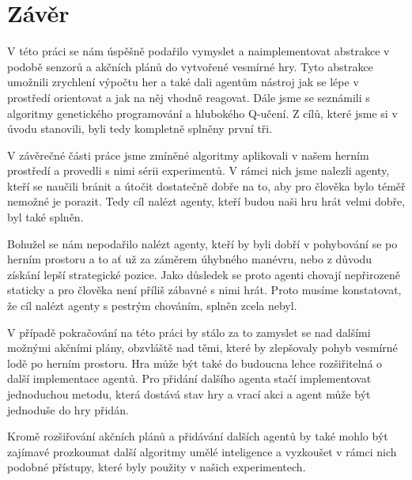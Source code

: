 \chapter*{Závěr}
V této práci se nám úspěšně podařilo vymyslet a naimplementovat abstrakce v podobě senzorů a akčních plánů do vytvořené vesmírné hry.
Tyto abstrakce umožnili zrychlení výpočtu her a také dali agentům nástroj jak se lépe v prostředí orientovat a jak na něj vhodně reagovat.
Dále jsme se seznámili s algoritmy genetického programování a hlubokého Q-učení.
Z cílů, které jsme si v úvodu stanovili, byli tedy kompletně splněny první tři.

V závěrečné části práce jsme zmíněné algoritmy aplikovali v našem herním prostředí a provedli s nimi sérii experimentů.
V rámci nich jsme nalezli agenty, kteří se naučili bránit a útočit dostatečně dobře na to, aby pro člověka bylo téměř nemožné je porazit.
Tedy cíl nalézt agenty, kteří budou naši hru hrát velmi dobře, byl také splněn.

Bohužel se nám nepodařilo nalézt agenty, kteří by byli dobří v pohybování se po herním prostoru a to ať už za záměrem úhybného manévru, nebo z důvodu získání lepší strategické pozice.
Jako důsledek se proto agenti chovají nepřirozeně staticky a pro člověka není příliš zábavné s nimi hrát.
Proto musíme konstatovat, že cíl nalézt agenty s pestrým chováním, splněn zcela nebyl.

V případě pokračování na této práci by stálo za to zamyslet se nad dalšími možnými akčními plány, obzvláště nad těmi, které by zlepšovaly pohyb vesmírné lodě po herním prostoru.
Hra může být také do budoucna lehce rozšiřitelná o další implementace agentů. Pro přidání dalšího agenta stačí implementovat jednoduchou metodu, která dostává stav hry a vrací akci a agent může být jednoduše do hry přidán. 

Kromě rozšiřování akčních plánů a přidávání dalších agentů by také mohlo být zajímavé prozkoumat další algoritmy umělé inteligence a vyzkoušet v rámci nich podobné přístupy, které byly použity v našich experimentech.

